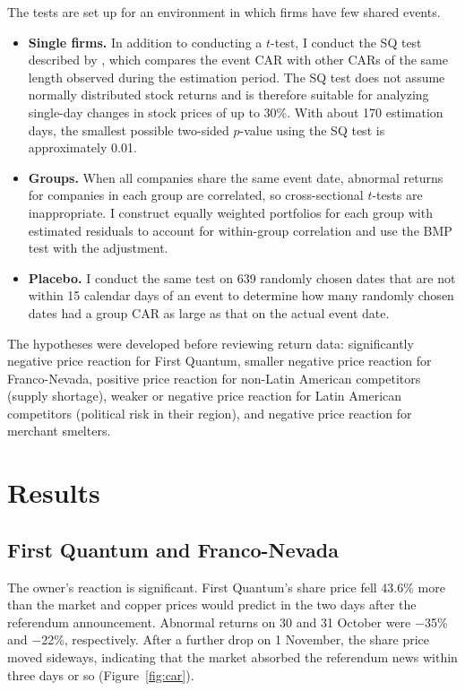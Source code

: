 \documentclass[11pt]{article}
\begin{document}
The tests are set up for an environment in which firms have few shared events.
\begin{itemize}[leftmargin=1.2em]
\item \textbf{Single firms.} In addition to conducting a $t$-test, I conduct the SQ test described by \citet{gelbach2013}, which compares the event CAR with other CARs of the same length observed during the estimation period. The SQ test does not assume normally distributed stock returns and is therefore suitable for analyzing single-day changes in stock prices of up to 30\%. With about 170 estimation days, the smallest possible two-sided $p$-value using the SQ test is approximately 0.01.
\item \textbf{Groups.} When all companies share the same event date, abnormal returns for companies in each group are correlated, so cross-sectional $t$-tests are inappropriate. I construct equally weighted portfolios for each group with estimated residuals to account for within-group correlation and use the BMP test with the \citet{kolari2010} adjustment.
\item \textbf{Placebo.} I conduct the same test on 639 randomly chosen dates that are not within 15 calendar days of an event to determine how many randomly chosen dates had a group CAR as large as that on the actual event date.
\end{itemize}

The hypotheses were developed before reviewing return data: significantly negative price reaction for First Quantum, smaller negative price reaction for Franco-Nevada, positive price reaction for non-Latin American competitors (supply shortage), weaker or negative price reaction for Latin American competitors (political risk in their region), and negative price reaction for merchant smelters.

\section{Results}

\subsection{First Quantum and Franco-Nevada}

The owner's reaction is significant. First Quantum's share price fell 43.6\% more than the market and copper prices would predict in the two days after the referendum announcement. Abnormal returns on 30 and 31 October were $-$35\% and $-$22\%, respectively. After a further drop on 1 November, the share price moved sideways, indicating that the market absorbed the referendum news within three days or so (Figure~\ref{fig:car}).
\end{document}
